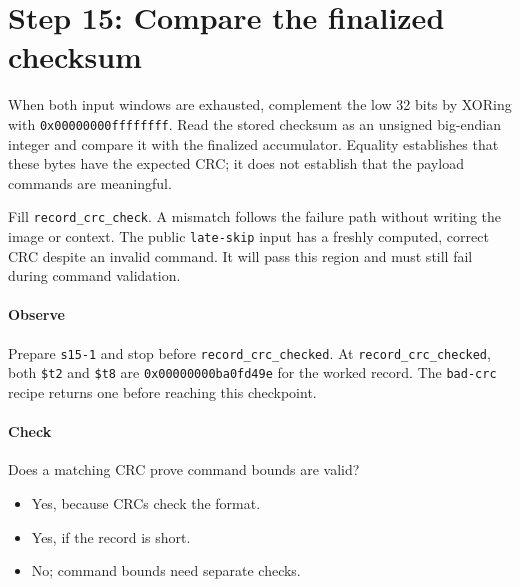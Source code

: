 \section{Step 15: Compare the finalized checksum}
When both input windows are exhausted, complement the low 32 bits by XORing
with \texttt{0x00000000ffffffff}. Read the stored checksum as an unsigned
big-endian integer and compare it with the finalized accumulator. Equality
establishes that these bytes have the expected CRC; it does not establish that
the payload commands are meaningful.

Fill \texttt{record\_crc\_check}. A mismatch follows the failure path without
writing the image or context. The public \texttt{late-skip} input has a freshly
computed, correct CRC despite an invalid command. It will pass this region and
must still fail during command validation.

\paragraph{Observe} Prepare \texttt{s15-1} and stop before
\texttt{record\_crc\_checked}. At \texttt{record\_crc\_checked}, both \texttt{\$t2} and
\texttt{\$t8} are \texttt{0x00000000ba0fd49e} for the worked record.
The \texttt{bad-crc} recipe returns one before reaching this checkpoint.

\paragraph{Check} Does a matching CRC prove command bounds are valid?
\begin{itemize}
  \item[A.] Yes, because CRCs check the format.
  \item[B.] Yes, if the record is short.
  \item[C.] No; command bounds need separate checks.
\end{itemize}
